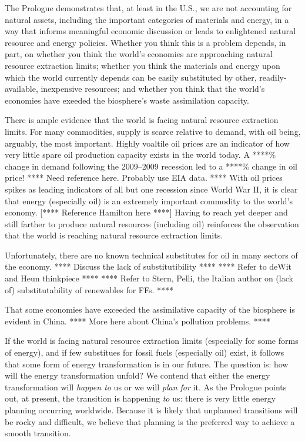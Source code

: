 The Prologue demonstrates that, at least in the U.S., 
we are not accounting for natural assets, 
including the important categories of materials and energy,
in a way that informs meaningful economic discussion or
leads to enlightened natural resource and energy policies.
Whether you think this is a problem depends, in part, on 
whether you think the world's economies are approaching 
	natural resource extraction limits;
whether you think the materials and energy upon which the world currently depends
	can be easily substituted by other, readily-available, inexpensive resources; and
whether you think that the world's economies have exeeded 
	the biosphere's waste assimilation capacity.

There is ample evidence that the world is facing
natural resource extraction limits.
For many commodities, supply is scarce relative to demand, 
with oil being, arguably, the most important. 
Highly voaltile oil prices are an indicator of how very little 
spare oil production capacity exists in the world today. 
A ****\% change in demand following the 2009--2009 recession
led to a ****\% change in oil price! 
**** Need reference here. Probably use EIA data. ****
With oil prices spikes as leading indicators of all but one recession 
since World War II, it is clear that energy (especially oil)
is an extremely important commodity to the world's economy.
[**** Reference Hamilton here ****]
Having to reach yet deeper and still farther 
to produce natural resources (including oil) 
reinforces the observation that 
the world is reaching natural resource extraction limits.

Unfortunately, there are no known technical substitutes for oil 
in many sectors of the economy.
**** Discuss the lack of substitutibility **** 
**** Refer to deWit and Heun thinkpiece ****
**** Refer to Stern, Pelli, the Italian author on (lack of) 
substitutability of renewables for FFs. ****

That some economies have exceeded the assimilative capacity of the biosphere
is evident in China. **** More here about China's pollution problems. ****

If the world is facing natural resource extraction limits
(especially for some forms of energy), 
and if few substitues for fossil fuels (especially oil) exist,
it follows that some form of energy transformation is in our future.
The question is: how will the energy transformation unfold?
We contend that either the energy transformation 
will \emph{happen to} us or we will \emph{plan for} it.
As the Prologue points out, at present, the transition is happening \emph{to} us:
there is very little energy planning occurring worldwide.
Because it is likely that unplanned transitions will be rocky and difficult,
we believe that planning is the preferred way to achieve a smooth transition.

